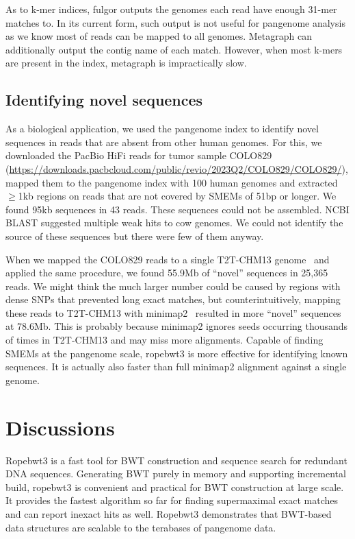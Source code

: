 \documentclass[webpdf,contemporary,large,namedate]{oup-authoring-template}%
\begin{document}
As to k-mer indices, fulgor outputs the genomes each read have enough 31-mer matches to.
In its current form, such output is not useful for pangenome analysis as we know most of reads can be mapped to all genomes.
Metagraph can additionally output the contig name of each match.
However, when most k-mers are present in the index, metagraph is impractically slow.

\subsection{Identifying novel sequences}

As a biological application, we used the pangenome index to identify novel sequences in reads that are absent from other human genomes.
For this, we downloaded the PacBio HiFi reads for tumor sample COLO829 (\url{https://downloads.pacbcloud.com/public/revio/2023Q2/COLO829/COLO829/}),
mapped them to the pangenome index with 100 human genomes
and extracted $\ge$1kb regions on reads that are not covered by SMEMs of 51bp or longer.
We found 95kb sequences in 43 reads.
These sequences could not be assembled.
NCBI BLAST suggested multiple weak hits to cow genomes.
We could not identify the source of these sequences but there were few of them anyway.

When we mapped the COLO829 reads to a single T2T-CHM13 genome~\citep{Nurk:2022up} and applied the same procedure,
we found 55.9Mb of ``novel'' sequences in 25,365 reads.
We might think the much larger number could be caused by regions with dense SNPs that prevented long exact matches,
but counterintuitively, mapping these reads to T2T-CHM13 with minimap2~\citep{Li:2018ab} resulted in more ``novel'' sequences at 78.6Mb.
This is probably because minimap2 ignores seeds occurring thousands of times in T2T-CHM13 and may miss more alignments.
Capable of finding SMEMs at the pangenome scale, ropebwt3 is more effective for identifying known sequences.
It is actually also faster than full minimap2 alignment against a single genome.

\section{Discussions}

Ropebwt3 is a fast tool for BWT construction and sequence search for redundant DNA sequences.
Generating BWT purely in memory and supporting incremental build, ropebwt3 is convenient and practical for BWT construction at large scale.
It provides the fastest algorithm so far for finding supermaximal exact matches and can report inexact hits as well.
Ropebwt3 demonstrates that BWT-based data structures are scalable to the terabases of pangenome data.
\end{document}
